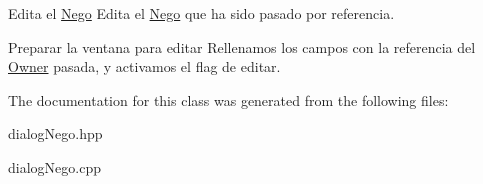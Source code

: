 Edita el \hyperlink{classNego}{Nego} Edita el \hyperlink{classNego}{Nego} que ha sido pasado por referencia. 

Preparar la ventana para editar Rellenamos los campos con la referencia del \hyperlink{classOwner}{Owner} pasada, y activamos el flag de editar. 

The documentation for this class was generated from the following files\+:\begin{DoxyCompactItemize}
\item 
dialog\+Nego.\+hpp\item 
dialog\+Nego.\+cpp\end{DoxyCompactItemize}
